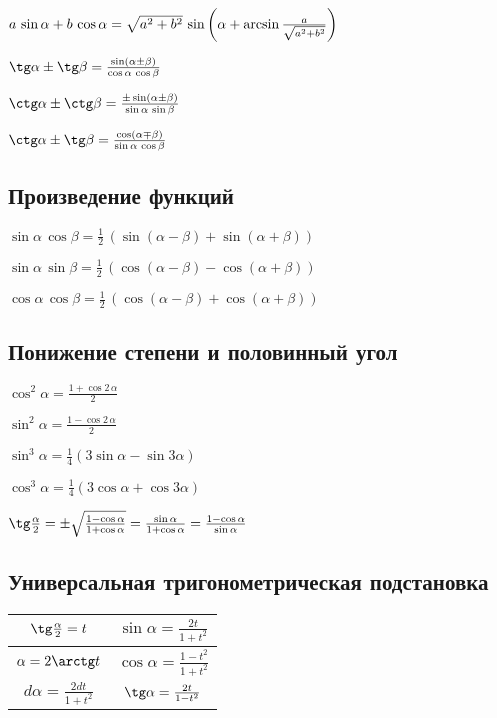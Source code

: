 $ a\, \sin \alpha + b\, \cos \alpha = \sqrt{\mathstrut a^2 + b^2}\, \sin \left(\alpha + \arcsin \frac{a}{\sqrt{\mathstrut a^2 + b^2}}\right) $

$ \tg \alpha \pm \tg \beta = \frac{\sin (\alpha \pm \beta)}{\cos \alpha\, \cos \beta} $

$ \ctg \alpha \pm \ctg \beta = \frac{\pm\sin (\alpha \pm \beta)}{\sin \alpha\, \sin \beta} $

$ \ctg \alpha \pm \tg \beta = \frac{\cos (\alpha \mp \beta)}{\sin \alpha\, \cos \beta} $

\subsection{Произведение функций}

$ \sin \alpha\, \cos \beta = \frac{1}{2}\, (\sin (\alpha - \beta) + \sin (\alpha + \beta)) $

$ \sin \alpha\, \sin \beta = \frac{1}{2}\, (\cos (\alpha - \beta) - \cos (\alpha + \beta)) $

$ \cos \alpha\, \cos \beta = \frac{1}{2}\, (\cos (\alpha - \beta) + \cos (\alpha + \beta)) $

\subsection{Понижение степени и половинный угол}

$ \cos^2 \alpha = \frac{1 + \cos 2\, \alpha}{2} $

$ \sin^2 \alpha = \frac{1 - \cos 2\, \alpha}{2} $

$ \sin^3 \alpha = \frac14(3\sin \alpha - \sin 3 \alpha) $

$ \cos^3 \alpha = \frac14(3\cos \alpha + \cos 3 \alpha) $

$ \tg \frac{\alpha}{2} = \pm \sqrt{\mathstrut \frac{1 - \cos \alpha}{1 + \cos \alpha}} = \frac{\sin \alpha}{1 + \cos \alpha} = \frac{1-\cos \alpha}{\sin \alpha} $

\subsection{Универсальная тригонометрическая подстановка}

\begin{tabu}[t]{||c|c||}
	\hline
		$ \tg \frac{\alpha}{2} = t $ & 		$ \sin \alpha = \frac{2t}{1 + t^2} $ \\
	\hline
		$ \alpha = 2\arctg t $ & 		$ \cos \alpha = \frac{1 - t^2}{1 + t^2} $ \\
	\hline
		$ d\alpha = \frac{2dt}{1+t^2}$ & 	$ \tg \alpha = \frac{2t}{1-t^2} $ \\
	\hline
\end{tabu}

